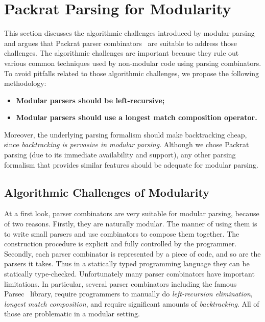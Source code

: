 \section{Packrat Parsing for Modularity}\label{sec:packrat}

This section discusses the algorithmic challenges introduced by
modular parsing and argues that Packrat parser combinators~\cite{Ford2002}
are suitable to address those challenges. The algorithmic challenges
are important because they rule out various common techniques
used by non-modular code using parsing combinators.
To avoid pitfalls related to those algorithmic challenges,
we propose the following methodology:

\begin{itemize}

\item {\bf Modular parsers should be left-recursive;}

\item {\bf Modular parsers should use a longest match composition operator.}

\end{itemize}

Moreover, the underlying parsing formalism should make backtracking
cheap, since \emph{backtracking is pervasive in modular parsing}.
Although we chose Packrat parsing (due to its immediate availability
and support), any other parsing formalism that provides similar
features should be adequate for modular parsing.

\subsection{Algorithmic Challenges of Modularity}\label{subsec:challenges}
At a first look, parser combinators are very suitable for modular parsing, because of two reasons. Firstly, they are naturally modular. The manner of using them is to write small parsers and use combinators to compose them together. The construction procedure is explicit and fully controlled by the programmer. Secondly, each parser combinator is represented by a piece of code, and so are the parsers it takes. Thus in a statically typed programming language they can be statically type-checked.
Unfortunately many parser combinators have important limitations.
In particular, several parser combinators including the famous Parsec~\cite{Leijen2001} library, require
programmers to manually do \textit{left-recursion elimination}, \textit{longest match composition}, and
require significant amounts of \textit{backtracking}. All of those are
problematic in a modular setting.

